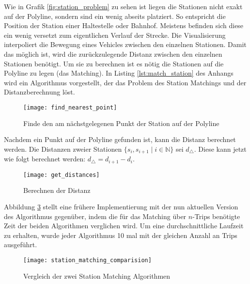     Wie in Grafik \ref{fig:station_problem} zu sehen ist liegen die Stationen nicht exakt auf der Polyline, sondern sind ein wenig abseits platziert. So entspricht die Position der Station einer Haltestelle oder Bahnhof. Meistens befinden sich diese ein wenig versetzt zum eigentlichen Verlauf der Strecke. Die Visualisierung interpoliert die Bewegung eines Vehicles zwischen den einzelnen Stationen. Damit das möglich ist, wird die zurückzulegende Distanz zwischen den einzelnen Stationen benötigt. Um sie zu berechnen ist es nötig die Stationen auf die Polyline zu legen (das Matching). In Listing \ref{lst:match_station} des Anhangs wird ein Algorithmus vorgestellt, der das Problem des Station Matchings und der Distanzberechnung löst. 

    \begin{figure}[htbp]
      \begin{center}
        \texttt{[image: find\_nearest\_point]}
        \caption{Finde den am nächstgelegenen Punkt der Station auf der Polyline}
        \label{fig:find_nearest_point}
      \end{center}
    \end{figure}

    Nachdem ein Punkt auf der Polyline gefunden ist, kann die Distanz berechnet werden. Die Distanzen zweier Stationen $\{s_i,s_{i+1} \;|\; i \in \mathbb{N} \}$ sei $d_\triangle$. Diese kann jetzt wie folgt berechnet werden: $ d_\triangle = d_{i+1} - d_i$. 

    \begin{figure}[htbp]
      \begin{center}
        \texttt{[image: get\_distances]}
        \caption{Berechnen der Distanz}
        \label{fig:get_distances}
      \end{center}
    \end{figure}
    
    Abbildung \ref{fig:station_matching_comparision} stellt eine frühere Implementierung mit der nun aktuellen Version des Algorithmus gegenüber, indem die für das Matching über $n$-Trips benötigte Zeit der beiden Algorithmen verglichen wird. Um eine durchschnittliche Laufzeit zu erhalten, wurde jeder Algorithmus 10 mal mit der gleichen Anzahl an Trips ausgeführt.

    \begin{figure}[ht]
      \begin{center}
        \texttt{[image: station\_matching\_comparision]}
        \caption{Vergleich der zwei Station Matching Algorithmen}
        \label{fig:station_matching_comparision}
      \end{center}
    \end{figure}

